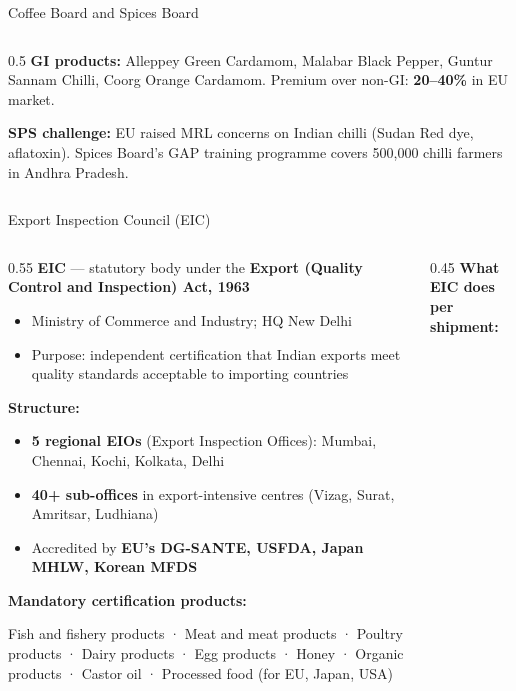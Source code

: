 \documentclass[
  ignorenonframetext,
  aspectratio=169,
]{beamer}
\makeatletter
\providecommand{\tightlist}{%
  \setlength{\itemsep}{0pt}\setlength{\parskip}{0pt}}
\let\quarto@originallabel\label
\DeclareRobustCommand*{\label}[1]{\quarto@originallabel{#1}}
\makeatother
\begin{document}
\begin{frame}{Coffee Board and Spices Board}
\begin{columns}[T]
\begin{column}{0.5\linewidth}
\textbf{GI products:} Alleppey Green Cardamom, Malabar Black Pepper,
Guntur Sannam Chilli, Coorg Orange Cardamom. Premium over non-GI:
\textbf{20--40\%} in EU market.

\textbf{SPS challenge:} EU raised MRL concerns on Indian chilli (Sudan
Red dye, aflatoxin). Spices Board's GAP training programme covers
500,000 chilli farmers in Andhra Pradesh.
\end{column}
\end{columns}
\end{frame}

\begin{frame}{Export Inspection Council (EIC)}
\label{export-inspection-council-eic}
\begin{columns}[T]
\begin{column}{0.55\linewidth}
\textbf{EIC} --- statutory body under the \textbf{Export (Quality
Control and Inspection) Act, 1963}

\begin{itemize}
\tightlist
\item
  Ministry of Commerce and Industry; HQ New Delhi
\item
  Purpose: independent certification that Indian exports meet quality
  standards acceptable to importing countries
\end{itemize}

\textbf{Structure:}

\begin{itemize}
\tightlist
\item
  \textbf{5 regional EIOs} (Export Inspection Offices): Mumbai, Chennai,
  Kochi, Kolkata, Delhi
\item
  \textbf{40+ sub-offices} in export-intensive centres (Vizag, Surat,
  Amritsar, Ludhiana)
\item
  Accredited by \textbf{EU's DG-SANTE, USFDA, Japan MHLW, Korean MFDS}
\end{itemize}

\textbf{Mandatory certification products:}

Fish and fishery products · Meat and meat products · Poultry products ·
Dairy products · Egg products · Honey · Organic products · Castor oil ·
Processed food (for EU, Japan, USA)
\end{column}

\begin{column}{0.45\linewidth}
\textbf{What EIC does per shipment:}


\end{column}
\end{columns}
\end{frame}
\end{document}
